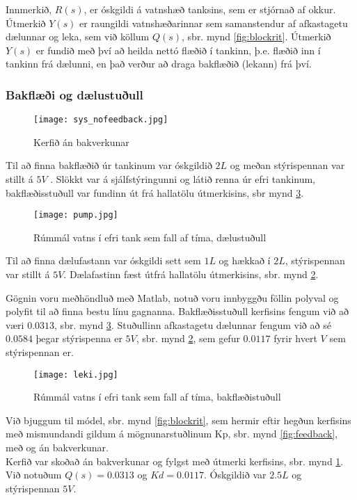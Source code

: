 \documentclass[12pt,final]{rureport}
\begin{document}
	Innmerkið, $R(s)$, er óskgildi á vatnshæð tanksins, sem er stjórnað af okkur. Útmerkið $Y(s)$ er raungildi vatnshæðarinnar sem samanstendur af afkastagetu dælunnar og leka, sem við köllum $Q(s)$, sbr. mynd \ref{fig:blockrit}. Útmerkið $Y(s)$ er fundið með því að heilda nettó flæðið í tankinn, þ.e. flæðið inn í tankinn frá dælunni, en það verður að draga bakflæðið (lekann) frá því.
	
	\subsubsection{Bakflæði og dælustuðull}
	
	\begin{figure}[h]
		\centering
		\texttt{[image: sys\_nofeedback.jpg]}
		\caption{Kerfið án bakverkunar}
		\label{fig:nofeedback}
	\end{figure}
	
	Til að finna bakflæðið úr tankinum var óskgildið $2L$ og meðan stýrispennan var stillt á $5V$ . Slökkt var á sjálfstýringunni og látið renna úr efri tankinum, bakflæðisstuðull var fundinn út frá hallatölu útmerkisins, sbr mynd \ref{fig:leki}.
	

	\begin{figure}[]
		\centering
		\texttt{[image: pump.jpg]}
		\caption{Rúmmál vatns í efri tank sem fall af tíma, dælustuðull}
		\label{fig:pump}
	\end{figure}
	
	Til að finna dælufastann var óskgildi sett sem $1L$ og hækkað í $2L$, stýrispennan var stillt á $5V$. Dælafastinn fæst útfrá hallatölu útmerkisins, sbr. mynd \ref{fig:pump}.
	
	Gögnin voru meðhöndluð með Matlab, notuð voru innbyggðu föllin polyval og polyfit til að finna bestu línu gagnanna. Bakflæðisstuðull kerfisins fengum við að væri $0.0313$, sbr. mynd \ref{fig:leki}. Stuðullinn afkastagetu dælunnar fengum við að sé $0.0584$ þegar stýrispenna er $5V$, sbr. mynd \ref{fig:pump}, sem gefur $0.0117$ fyrir hvert $V$ sem stýrispennan er.
	
	\begin{figure}[]
		\centering
		\texttt{[image: leki.jpg]}
		\caption{Rúmmál vatns í efri tank sem fall af tíma, bakflæðistuðull}
		\label{fig:leki}
	\end{figure}
	
	Við bjuggum til módel, sbr. mynd \ref{fig:blockrit}, sem hermir eftir hegðun kerfisins með mismundandi gildum á mögnunarstuðlinum Kp, sbr. mynd \ref{fig:feedback}, með og án bakverkunar. \\Kerfið var skoðað án bakverkunar og fylgst með útmerki kerfisins, sbr. mynd \ref{fig:nofeedback}. Við notuðum $Q(s) = 0.0313$ og $Kd = 0.0117$. Óskgildið var $2.5L$ og stýrispennan $5V$.
	
\end{document}
